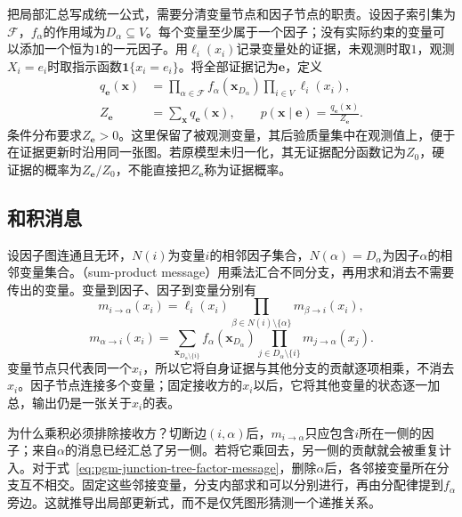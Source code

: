 把局部汇总写成统一公式，需要分清变量节点和因子节点的职责。设因子索引集为$\mathcal{F}$，$f_\alpha$的作用域为$D_\alpha\subseteq V$。每个变量至少属于一个因子；没有实际约束的变量可以添加一个恒为$1$的一元因子。用$\ell_i(x_i)$记录变量处的证据，未观测时取$1$，观测$X_i=e_i$时取指示函数$\mathbf{1}\{x_i=e_i\}$。将全部证据记为$\bm{e}$，定义
\begin{equation}
  \begin{aligned}
    q_{\bm{e}}(\bm{x})
      &=\prod_{\alpha\in\mathcal{F}}f_\alpha(\bm{x}_{D_\alpha})
        \prod_{i\in V}\ell_i(x_i),\\
    Z_{\bm{e}}&=\sum_{\bm{x}}q_{\bm{e}}(\bm{x}),\qquad
    p(\bm{x}\mid\bm{e})=\frac{q_{\bm{e}}(\bm{x})}{Z_{\bm{e}}}.
  \end{aligned}
  \label{eq:pgm-junction-tree-evidence-weight}
\end{equation}
条件分布要求$Z_{\bm{e}}>0$。这里保留了被观测变量，其后验质量集中在观测值上，便于在证据更新时沿用同一张图。若原模型未归一化，其无证据配分函数记为$Z_0$，硬证据的概率为$Z_{\bm{e}}/Z_0$，不能直接把$Z_{\bm{e}}$称为证据概率。

\subsection{和积消息}
\label{sec:pgm-junction-tree-sum-product}

设因子图连通且无环，$N(i)$为变量$i$的相邻因子集合，$N(\alpha)=D_\alpha$为因子$\alpha$的相邻变量集合。（sum-product message）用乘法汇合不同分支，再用求和消去不需要传出的变量。变量到因子、因子到变量分别有
\begin{equation}
  m_{i\to\alpha}(x_i)
    =\ell_i(x_i)
      \prod_{\beta\in N(i)\setminus\{\alpha\}}
      m_{\beta\to i}(x_i),
  \label{eq:pgm-junction-tree-variable-message}
\end{equation}
\begin{equation}
  m_{\alpha\to i}(x_i)
    =\sum_{\bm{x}_{D_\alpha\setminus\{i\}}}
      f_\alpha(\bm{x}_{D_\alpha})
      \prod_{j\in D_\alpha\setminus\{i\}}
      m_{j\to\alpha}(x_j).
  \label{eq:pgm-junction-tree-factor-message}
\end{equation}
变量节点只代表同一个$x_i$，所以它将自身证据与其他分支的贡献逐项相乘，不消去$x_i$。因子节点连接多个变量；固定接收方的$x_i$以后，它将其他变量的状态逐一加总，输出仍是一张关于$x_i$的表。

为什么乘积必须排除接收方？切断边$(i,\alpha)$后，$m_{i\to\alpha}$只应包含$i$所在一侧的因子；来自$\alpha$的消息已经汇总了另一侧。若将它乘回去，另一侧的贡献就会被重复计入。对于式~\eqref{eq:pgm-junction-tree-factor-message}，删除$\alpha$后，各邻接变量所在分支互不相交。固定这些邻接变量，分支内部求和可以分别进行，再由分配律提到$f_\alpha$旁边。这就推导出局部更新式，而不是仅凭图形猜测一个递推关系。

